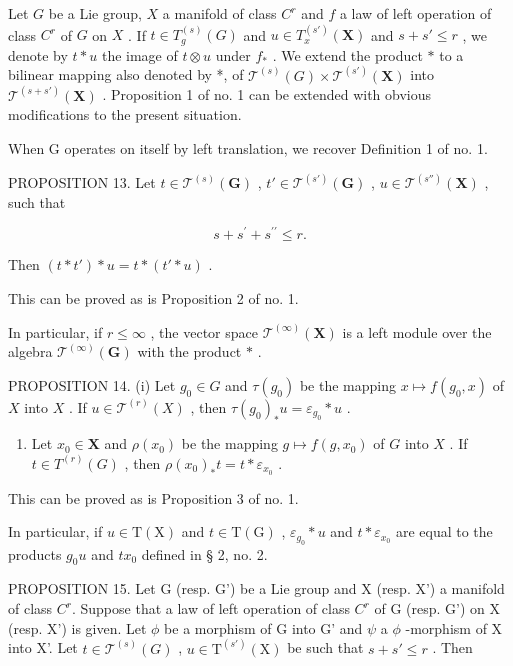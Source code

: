 Let \(G\) be a Lie group, \(X\) a manifold of class \(C^r\) and \(f\) a law of left operation of class \(C^r\) of \(G\) on \(X\) . If \(t \in T_g^{(s)}(G)\) and \(u \in T_x^{(s')}(\mathbf{X})\) and \(s + s' \leqslant r\) , we denote by \(t * u\) the image of \(t \otimes u\) under \(f_*\) . We extend the product \(*\) to a bilinear mapping also denoted by *, of \(\mathcal{T}^{(s)}(G) \times \mathcal{T}^{(s')}(\mathbf{X})\) into \(\mathcal{T}^{(s+s')}(\mathbf{X})\) . Proposition 1 of no. 1 can be extended with obvious modifications to the present situation.

When G operates on itself by left translation, we recover Definition 1 of no. 1.

PROPOSITION 13. Let \(t \in \mathcal{T}^{(s)}(\mathbf{G})\) , \(t' \in \mathcal{T}^{(s')}(\mathbf{G})\) , \(u \in \mathcal{T}^{(s'')}(\mathbf{X})\) , such that

\[
s + s ^ {\prime} + s ^ {\prime \prime} \leqslant r.
\]

Then \((t*t')*u=t*(t'*u)\) .

This can be proved as is Proposition 2 of no. 1.

In particular, if \(r \leqslant \infty\) , the vector space \(\mathcal{T}^{(\infty)}(\mathbf{X})\) is a left module over the algebra \(\mathcal{T}^{(\infty)}(\mathbf{G})\) with the product \(*\) .

PROPOSITION 14. (i) Let \(g_0 \in G\) and \(\tau(g_0)\) be the mapping \(x \mapsto f(g_0, x)\) of \(X\) into \(X\) . If \(u \in \mathcal{T}^{(r)}(X)\) , then \(\tau(g_0)_*u = \varepsilon_{g_0} * u\) .

\begin{enumerate}
\def\labelenumi{(\roman{enumi})}
\setcounter{enumi}{1}
\tightlist
\item
  Let \(x_0 \in \mathbf{X}\) and \(\rho(x_0)\) be the mapping \(g \mapsto f(g, x_0)\) of \(G\) into \(X\) . If \(t \in T^{(r)}(G)\) , then \(\rho(x_0)_*t = t * \varepsilon_{x_0}\) .
\end{enumerate}

This can be proved as is Proposition 3 of no. 1.

In particular, if \(u \in \mathrm{T}(\mathrm{X})\) and \(t \in \mathrm{T}(\mathrm{G})\) , \(\varepsilon_{g_0} * u\) and \(t * \varepsilon_{x_0}\) are equal to the products \(g_0u\) and \(tx_0\) defined in § 2, no. 2.

PROPOSITION 15. Let G (resp. G') be a Lie group and X (resp. X') a manifold of class \(C^{r}\). Suppose that a law of left operation of class \(C^{r}\) of G (resp. G') on X (resp. X') is given. Let \(\phi\) be a morphism of G into G' and \(\psi\) a \(\phi\) -morphism of X into X'. Let \(t \in \mathcal{T}^{(s)}(G)\) , \(u \in \mathrm{T}^{(s')}(\mathrm{X})\) be such that \(s + s' \leqslant r\) . Then


